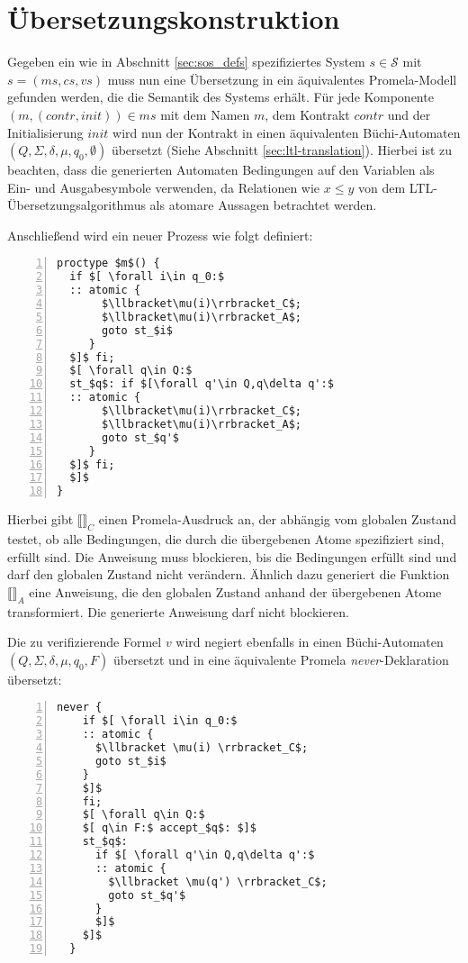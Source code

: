 \section{Übersetzungskonstruktion}
Gegeben ein wie in Abschnitt \ref{sec:sos_defs} spezifiziertes System $s\in \mathcal{S}$ mit $s=(ms,cs,vs)$ muss nun eine Übersetzung in ein äquivalentes Promela-Modell gefunden werden, die die Semantik des Systems erhält.
Für jede Komponente $(m,(\mathit{contr},\mathit{init}))\in ms$ mit dem Namen $m$, dem Kontrakt $\mathit{contr}$ und der Initialisierung $\mathit{init}$ wird nun der Kontrakt in einen äquivalenten Büchi-Automaten $(Q,\Sigma,\delta,\mu,q_0,\emptyset)$ übersetzt (Siehe Abschnitt \ref{sec:ltl-translation}).
Hierbei ist zu beachten, dass die generierten Automaten Bedingungen auf den Variablen als Ein- und Ausgabesymbole verwenden, da Relationen wie $x\leq y$ von dem LTL-Übersetzungsalgorithmus als atomare Aussagen betrachtet werden.


Anschließend wird ein neuer Prozess wie folgt definiert:
\begin{lstlisting}[language=Promela,mathescape=true,numbers=left,numberstyle=\small]
proctype $m$() {
  if $[ \forall i\in q_0:$
  :: atomic {
       $\llbracket\mu(i)\rrbracket_C$;
       $\llbracket\mu(i)\rrbracket_A$;
       goto st_$i$
     }
  $]$ fi;
  $[ \forall q\in Q:$
  st_$q$: if $[\forall q'\in Q,q\delta q':$
  :: atomic {
       $\llbracket\mu(i)\rrbracket_C$;
       $\llbracket\mu(i)\rrbracket_A$;
       goto st_$q'$
     }
  $]$ fi;
  $]$
}
\end{lstlisting}
Hierbei gibt $\llbracket\rrbracket_C$ einen Promela-Ausdruck an, der abhängig vom globalen Zustand testet, ob alle Bedingungen, die durch die übergebenen Atome spezifiziert sind, erfüllt sind.
Die Anweisung muss blockieren, bis die Bedingungen erfüllt sind und darf den globalen Zustand nicht verändern.
Ähnlich dazu generiert die Funktion $\llbracket\rrbracket_A$ eine Anweisung, die den globalen Zustand anhand der übergebenen Atome transformiert.
Die generierte Anweisung darf nicht blockieren.

Die zu verifizierende Formel $v$ wird negiert ebenfalls in einen Büchi-Automaten $(Q,\Sigma,\delta,\mu,q_0,F)$ übersetzt und in eine äquivalente Promela \emph{never}-Deklaration übersetzt:
\begin{lstlisting}[language=Promela,mathescape=true,numbers=left,numberstyle=\small]
  never {
    if $[ \forall i\in q_0:$
    :: atomic {
      $\llbracket \mu(i) \rrbracket_C$;
      goto st_$i$
    }
    $]$
    fi;
    $[ \forall q\in Q:$
    $[ q\in F:$ accept_$q$: $]$
    st_$q$:
      if $[ \forall q'\in Q,q\delta q':$
      :: atomic {
        $\llbracket \mu(q') \rrbracket_C$;
        goto st_$q'$
      }
      $]$
    $]$
  }
\end{lstlisting}

